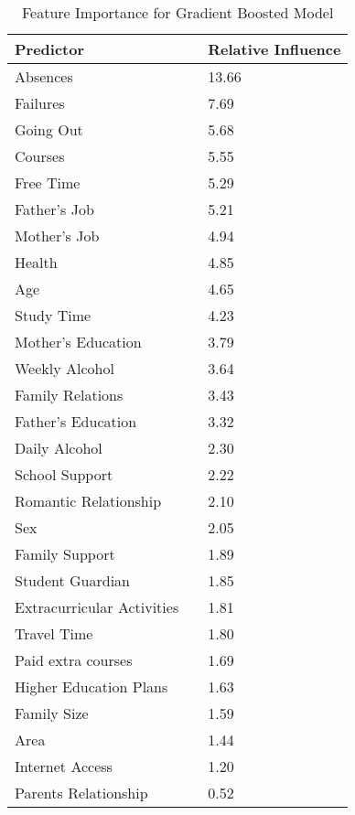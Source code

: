 \documentclass[sigconf]{acmart}
\begin{document}

\begin{table}
  \caption{Feature Importance for Gradient Boosted Model}
  \label{tab:freq}
  \begin{tabular}{lll}
    \toprule
    Predictor&  & Relative Influence  \\    
    \midrule
    Absences                &  &  13.66 \\
    Failures                &  &   7.69 \\
    Going Out               &  &   5.68 \\
    Courses                 &  &   5.55 \\ 
    Free Time               &  &   5.29 \\
    Father's Job            &  &   5.21 \\   
    Mother's Job            &  &   4.94 \\   
    Health                  &  &   4.85 \\  
    Age                     &  &   4.65 \\
    Study Time              &  &   4.23 \\   
    Mother's Education      &  &   3.79 \\
    Weekly Alcohol          &  &   3.64 \\
    Family Relations        &  &   3.43 \\    
    Father's Education      &  &   3.32 \\
    Daily Alcohol           &  &   2.30 \\
    School Support          &  &   2.22 \\    
    Romantic Relationship   &  &   2.10 \\
    Sex                     &  &   2.05 \\
    Family Support          &  &   1.89 \\
    Student Guardian        &  &   1.85 \\
    Extracurricular Activities &  &1.81 \\
    Travel Time             &  &   1.80 \\    
    Paid extra courses      &  &   1.69 \\
    Higher Education Plans  &  &   1.63 \\
    Family Size             &  &   1.59 \\
    Area                    &  &   1.44 \\
    Internet Access         &  &   1.20 \\
    Parents Relationship    &  &   0.52 \\
    \bottomrule
  \end{tabular}
\end{table}
\end{document}
